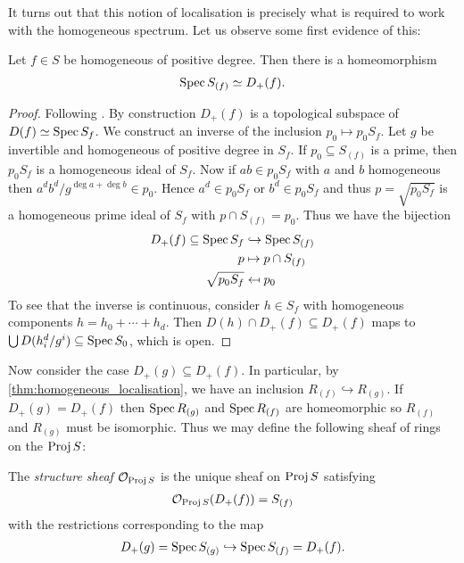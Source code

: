 \documentclass{article}
\begin{document}
It turns out that this notion of localisation is precisely what is
required to work with the homogeneous spectrum. Let us observe some
first evidence of this:

\begin{lemma}\label{thm:homogeneous_localisation}
  Let $f\in S$ be homogeneous of positive degree. Then there is
  a homeomorphism
  \begin{align*}
    \operatorname{Spec} S_{(f)} \simeq D_+(f).
  \end{align*}
  \begin{proof}
    Following \cite[\href{https://stacks.math.columbia.edu/tag/00JO}{Tag 00JO}]{stacks-project}.
    By construction $D_+(f)$ is a topological subspace of
    $D(f)\simeq\operatorname{Spec} S_f$.
    We construct an inverse of the inclusion $p_0\mapsto p_0 S_f$.
    Let $g$ be invertible and homogeneous of positive degree in
    $S_f$. If $p_0\subseteq S_{(f)}$ is a prime, then $p_0 S_f$
    is a homogeneous ideal of $S_f$. Now if $ab\in p_0 S_f$ with
    $a$ and $b$ homogeneous then $a^db^d/g^{\deg a + \deg b}\in p_0$.
    Hence $a^d\in p_0 S_f$ or $b^d\in p_0 S_f$ and thus $p=\sqrt{p_0 S_f}$ is a homogeneous prime ideal of $S_f$ with
    $p \cap S_{(f)} = p_0$. Thus we have the bijection
    \begin{align*}
      D_+(f) \subseteq \operatorname{Spec} S_f &\hookrightarrow \operatorname{Spec} S_{(f)} \\
      p &\mapsto p \cap S_{(f)} \\
      \sqrt{p_0 S_f} &\mapsfrom p_0
    \end{align*}
    To see that the inverse is continuous, consider $h\in S_f$
    with homogeneous components $h = h_0 + \cdots + h_d$. Then
    $D(h)\cap D_+(f)\subseteq D_+(f)$ maps to
    $\bigcup D(h_i^d / g^i)\subseteq \operatorname{Spec} S_0$, which is open.
  \end{proof}
\end{lemma}


Now consider the case $D_+(g)\subseteq D_+(f)$. In particular,
by \ref{thm:homogeneous_localisation}, we have an inclusion
$R_{(f)}\hookrightarrow R_{(g)}$. If $D_+(g)=D_+(f)$ then
$\operatorname{Spec} R_{(g)}$ and $\operatorname{Spec} R_{(f)}$ are homeomorphic so
$R_{(f)}$ and $R_{(g)}$ must be isomorphic.
Thus we may define the following sheaf of rings on the $\operatorname{Proj} S$:

\begin{definition}\label{def:structure_sheaf}
  The \emph{structure sheaf} $\mathcal O_{\operatorname{Proj} S}$ is the unique sheaf
  on $\operatorname{Proj} S$ satisfying
  \begin{align}\label{eq:structure_sheaf}
    \mathcal O_{\operatorname{Proj} S}(D_+(f)) = S_{(f)}
  \end{align}
  with the restrictions corresponding to the map
  \begin{align*}
    D_+(g) = \operatorname{Spec} S_{(g)} \hookrightarrow \operatorname{Spec} S_{(f)} = D_+(f).
  \end{align*}
\end{definition}
\end{document}
